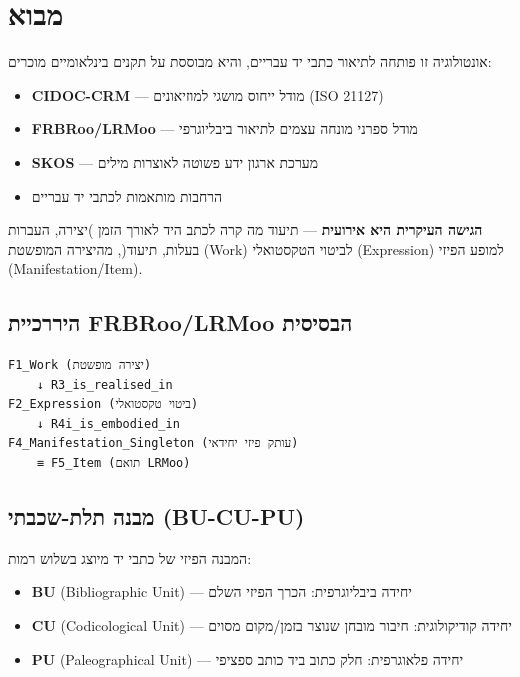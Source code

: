 \section{מבוא}

אונטולוגיה זו פותחה לתיאור כתבי יד עבריים, והיא מבוססת על תקנים בינלאומיים מוכרים:

\begin{itemize}
\item \textbf{CIDOC-CRM} — מודל ייחוס מושגי למוזיאונים \textenglish{(ISO 21127)}
\item \textbf{FRBRoo/LRMoo} — מודל ספרני מונחה עצמים לתיאור ביבליוגרפי
\item \textbf{SKOS} — מערכת ארגון ידע פשוטה לאוצרות מילים
\item הרחבות מותאמות לכתבי יד עבריים
\end{itemize}

\textbf{הגישה העיקרית היא אירועית} — תיעוד מה קרה לכתב היד לאורך הזמן )יצירה, העברות בעלות, תיעוד(, מהיצירה המופשטת \textenglish{(Work)} לביטוי הטקסטואלי \textenglish{(Expression)} למופע הפיזי \textenglish{(Manifestation/Item)}.

\subsection{היררכיית FRBRoo/LRMoo הבסיסית}

\begin{verbatim}
F1_Work (יצירה מופשטת)
    ↓ R3_is_realised_in
F2_Expression (ביטוי טקסטואלי)
    ↓ R4i_is_embodied_in
F4_Manifestation_Singleton (עותק פיזי יחידאי)
    ≡ F5_Item (תואם LRMoo)
\end{verbatim}

\subsection{מבנה תלת-שכבתי \textenglish{(BU-CU-PU)}}

המבנה הפיזי של כתבי יד מיוצג בשלוש רמות:

\begin{itemize}
\item \textbf{BU} \textenglish{(Bibliographic Unit)} — יחידה ביבליוגרפית: הכרך הפיזי השלם
\item \textbf{CU} \textenglish{(Codicological Unit)} — יחידה קודיקולוגית: חיבור מובחן שנוצר בזמן/מקום מסוים
\item \textbf{PU} \textenglish{(Paleographical Unit)} — יחידה פלאוגרפית: חלק כתוב ביד כותב ספציפי
\end{itemize}

